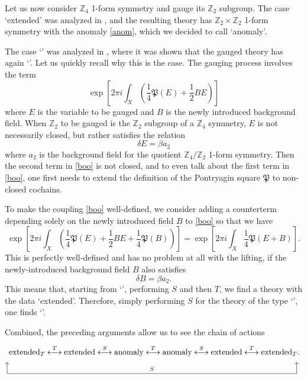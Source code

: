 \documentclass[12pt]{article}
\numberwithin{equation}{section}
\def\bZ{\mathbb{Z}}
\def\fP{\mathfrak{P}}
\begin{document}
Let us now consider $\bZ_4$ 1-form symmetry and gauge its $\bZ_2$ subgroup.
The case  `extended' was analyzed in \cite{Tachikawa:2017gyf},
and the resulting theory has $\bZ_2\times \bZ_2$ 1-form symmetry with the anomaly \eqref{anom}, 
which we decided to call `anomaly'.

The case `\Textended' was analyzed in \cite{Hsin:2020nts},
where it was shown that the gauged theory has again `\Textended'.
Let us quickly recall why this is the case. 
The gauging process involves the term
 \begin{equation}
\exp\left[2\pi i\int_X \left( \frac14 \fP(E) +\frac12 B E\right)\right]
\label{boo}
\end{equation}
where $E$ is the variable to be gauged and $B$ is the newly introduced background field.
When $\bZ_2$ to be gauged is the $\bZ_2$ subgroup of a $\bZ_4$ symmetry,
$E$ is not necessarily closed, but rather satisfies the relation \begin{equation}
\delta E = \beta a_2
\end{equation}
where $a_2$ is the background field for the quotient $\bZ_4/\bZ_2$ 1-form symmetry.
Then the second term in \eqref{boo} is not closed, 
and to even talk about the first term in \eqref{boo}, one first needs to extend the definition of the Pontryagin square $\fP$ to non-closed cochains.

To make  the coupling \eqref{boo}  well-defined, we consider adding a counterterm depending solely on the newly introduced field $B$ to \eqref{boo} so that we have \begin{equation}
\exp\left[2\pi i\int_X \left( \frac14 \fP(E) +\frac12 B E + \frac14 \fP(B) \right)\right]
= 
\exp \left[2\pi i \int_X \frac14 \fP(E+B)\right] .
\end{equation}
This is perfectly well-defined and has no problem at all with the lifting,
if the newly-introduced background field $B$  also satisfies \begin{equation}
\delta B=\beta a_2.
\end{equation}
This means that, starting from `\Textended', performing $S$ and then $T$, we find a theory with the data `extended'.
Therefore, simply performing $S$ for the theory of the type `\Textended',  one  finds `\Textended'.

Combined, the preceding arguments allow us to see the chain of actions \begin{equation}
\begin{tikzpicture}
	\node at (0,0) {$
		\text{\Textended} \stackrel{T}{\longleftrightarrow} 
		\text{extended} \stackrel{S}{\longleftrightarrow} 
		\text{anomaly} \stackrel{T}{\longleftrightarrow} 
		\text{anomaly} \stackrel{S}{\longleftrightarrow} 
		\text{extended}\stackrel{T}{\longleftrightarrow} 
		\text{\Textended}.
	$};
	\draw[->] (-6.5,-1) -- (-6.5,-0.5);
	\draw[->] (6.3,-1) -- (6.3,-0.5);
	\draw (-6.5,-1) -- node[above] {\scriptsize $S$} (6.3,-1);
\end{tikzpicture}
\label{nontrivial-chain}
\end{equation}
\end{document}
